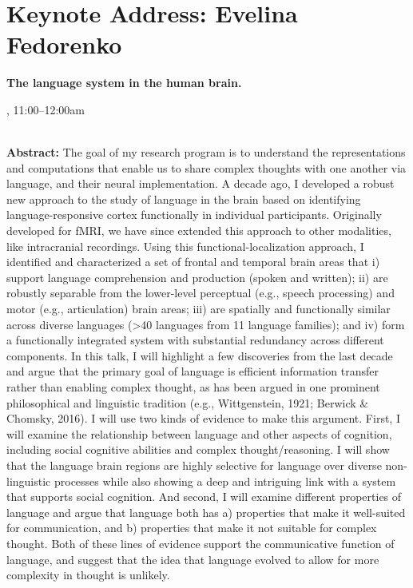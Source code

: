 \section{Keynote Address: Evelina Fedorenko}

\begin{center}
\begin{Large}
{\bfseries\Large The language system in the human brain.}
\vspace{1em}\par
\end{Large}

\daydateyear, 11:00--12:00am \vspace{1em}\\
\PlenaryLoc \\
\vspace{1em}\par
\end{center}

\noindent
{\bfseries Abstract:} The goal of my research program is to understand the representations and computations that enable us to share complex thoughts with one another via language, and their neural implementation. A decade ago, I developed a robust new approach to the study of language in the brain based on identifying language-responsive cortex functionally in individual participants. Originally developed for fMRI, we have since extended this approach to other modalities, like intracranial recordings. Using this functional-localization approach, I identified and characterized a set of frontal and temporal brain areas that i) support language comprehension and production (spoken and written); ii) are robustly separable from the lower-level perceptual (e.g., speech processing) and motor (e.g., articulation) brain areas; iii) are spatially and functionally similar across diverse languages (>40 languages from 11 language families); and iv) form a functionally integrated system with substantial redundancy across different components. In this talk, I will highlight a few discoveries from the last decade and argue that the primary goal of language is efficient information transfer rather than enabling complex thought, as has been argued in one prominent philosophical and linguistic tradition (e.g., Wittgenstein, 1921; Berwick & Chomsky, 2016). I will use two kinds of evidence to make this argument. First, I will examine the relationship between language and other aspects of cognition, including social cognitive abilities and complex thought/reasoning. I will show that the language brain regions are highly selective for language over diverse non-linguistic processes while also showing a deep and intriguing link with a system that supports social cognition. And second, I will examine different properties of language and argue that language both has a) properties that make it well-suited for communication, and b) properties that make it not suitable for complex thought. Both of these lines of evidence support the communicative function of language, and suggest that the idea that language evolved to allow for more complexity in thought is unlikely.

